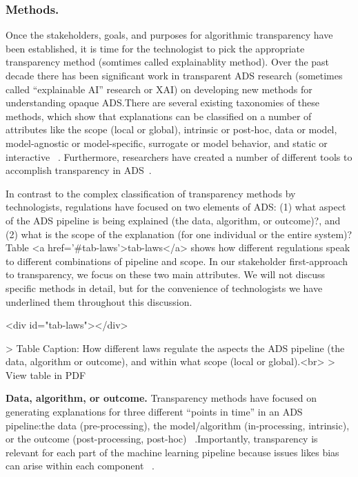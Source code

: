 \documentclass[sigconf, nonacm]{acmart}
\begin{document}
\subsubsection{Methods.}Once the stakeholders, goals, and purposes for algorithmic transparency have been established, it is time for the technologist to pick the appropriate transparency method (somtimes called explainablity method). Over the past decade there has been significant work in transparent ADS research (sometimes called ``explainable AI'' research or XAI) on developing new methods for understanding opaque ADS.There are several existing taxonomies of these methods, which show that explanations can be classified on a number of attributes like the scope (local or global), intrinsic or post-hoc, data or model, model-agnostic or model-specific, surrogate or model behavior, and static or interactive ~\cite{DBLP:journals/jmlr/AryaBCDHHHLLMMP20, molnar2019, DBLP:journals/corr/abs-2012-01805}. Furthermore, researchers have created a number of different tools to accomplish transparency in ADS~\cite{DBLP:conf/nips/LundbergL17, ribeiro2016should, datta2016algorithmic, DBLP:journals/corr/abs-2004-00668, DBLP:journals/corr/abs-2004-00668}.

In contrast to the complex classification of transparency methods by technologists, regulations have focused on two elements of ADS: (1) what aspect of the ADS pipeline is being explained (the data, algorithm, or outcome)?, and (2) what is the scope of the explanation (for one individual or the entire system)? Table <a href='#tab-laws'>tab-laws</a> shows how different regulations speak to different combinations of pipeline and scope. In our stakeholder first-approach to transparency, we focus on these two main attributes. We will not discuss specific methods in detail, but for the convenience of technologists we have underlined them throughout this discussion.

\begin{table}<div id="tab-laws"></div>

> Table Caption: How different laws regulate the aspects the ADS pipeline (the data, algorithm or outcome), and within what scope (local or global).<br>
> View table in PDF
\end{table}

\textbf{Data, algorithm, or outcome.} Transparency methods have focused on generating explanations for three different ``points in time'' in an ADS pipeline:the data (pre-processing), the model/algorithm (in-processing, intrinsic), or the outcome (post-processing, post-hoc) ~\cite{DBLP:journals/jmlr/AryaBCDHHHLLMMP20, ventocilla2018towards}.Importantly, transparency is relevant for each part of the machine learning pipeline because issues likes bias can arise within each component ~\cite{yang2020fairness}.
\end{document}
